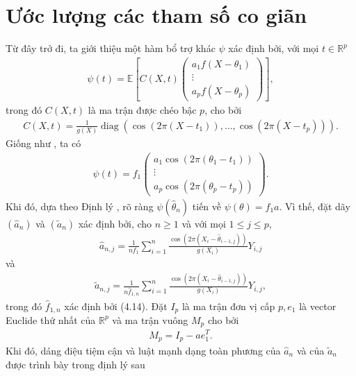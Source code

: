 \section{Ước lượng các tham số co giãn}
Từ đây trở đi, ta giới thiệu một hàm bổ trợ khác $\psi$ xác định bởi, với mọi $t \in \mathbb{R}^{p}$
\begin{align}
    \psi(t)=\mathbb{E}\left[C(X, t)\left(\begin{array}{c}
    a_{1} f\left(X-\theta_{1}\right) \\
    \vdots \\
    a_{p} f\left(X-\theta_{p}\right)
    \end{array}\right)\right],
    \label{5.1}
\end{align}
trong đó $C(X, t)$ là ma trận được chéo bậc $p$, cho bởi
\begin{align}
    C(X, t)=\frac{1}{g(X)} \operatorname{diag}\left(\cos \left(2 \pi\left(X-t_{1}\right)\right), \ldots, \cos \left(2 \pi\left(X-t_{p}\right)\right)\right).
    \label{5.2}
\end{align}
Giống như , ta có
\begin{align}
    \psi(t)=f_{1}\left(\begin{array}{c}
a_{1} \cos \left(2 \pi\left(\theta_{1}-t_{1}\right)\right) \\
\vdots \\
a_{p} \cos \left(2 \pi\left(\theta_{p}-t_{p}\right)\right)
\end{array}\right).
\label{5.3}
\end{align}
Khi đó, dựa theo Định lý , rõ ràng $\psi\left(\widehat{\theta}_{n}\right)$ tiến về $\psi(\theta)=f_{1} a$. Vì thế, đặt dãy $\left(\widehat{a}_{n}\right)$ và $\left(\widetilde{a}_{n}\right)$ xác định bởi, cho $n \geq 1$ và với mọi $1 \leq j \leq p$,
\begin{align}
    \widehat{a}_{n, j}=\frac{1}{n f_{1}} \sum_{i=1}^{n} \frac{\cos \left(2 \pi\left(X_{i}-\widehat{\theta}_{i-1, j}\right)\right)}{g\left(X_{i}\right)} Y_{i, j}
    \label{5.4}
\end{align}
và
\begin{align}
    \widetilde{a}_{n, j}=\frac{1}{n \widehat{f}_{1, n}} \sum_{i=1}^{n} \frac{\cos \left(2 \pi\left(X_{i}-\widehat{\theta}_{i-1, j}\right)\right)}{g\left(X_{i}\right)} Y_{i, j},
    \label{5.5}
\end{align}
trong đó $\widehat{f}_{1, n}$ xác định bởi (4.14). Đặt $I_{p}$  là ma trận đơn vị cấp $p, e_{1}$ là vector Euclide thứ nhất của $\mathbb{R}^{p}$ và ma trận vuông $M_{p}$ cho bởi
\begin{align}
    M_{p}=I_{p}-a e_{1}^{T}.
    \label{5.6}
\end{align}
Khi đó, dáng điệu tiệm cận và luật mạnh dạng toàn phương của $\widehat{a}_{n}$ và của $\widetilde{a}_{n}$ được trình bày trong định lý sau

